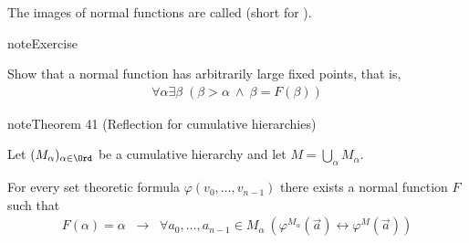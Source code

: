 \documentclass[letterpaper,10pt,english]{jupyterBook}
\begin{document}
\sphinxAtStartPar
The images of normal functions are called  (short for ).

\begin{sphinxadmonition}{note}{Exercise}

\sphinxAtStartPar
Show that a normal function has arbitrarily large fixed points, that is,
\begin{equation*}
\begin{split}
\forall \alpha \exists \beta \; (\beta > \alpha \: \wedge \: \beta = F(\beta))
\end{split}
\end{equation*}\end{sphinxadmonition}
\label{constructible:thm-reflection}
\begin{sphinxadmonition}{note}{Theorem 41 (Reflection for cumulative hierarchies)}



\sphinxAtStartPar
Let \((M_\alpha)_{\alpha \in \Ord}\) be a cumulative hierarchy and let \(M = \bigcup_\alpha M_\alpha\).

\sphinxAtStartPar
For every set theoretic formula \(\varphi(v_0, \dots, v_{n-1})\) there exists a normal function \(F\) such that
\begin{equation*}
\begin{split}
	F(\alpha) = \alpha \; \; \rightarrow \;\;  \forall a_0, \dots, a_{n-1} \in M_\alpha \: (\varphi^{M_\alpha}(\vec{a}) \leftrightarrow \varphi^{M}(\vec{a}))
\end{split}
\end{equation*}\end{sphinxadmonition}
\end{document}
